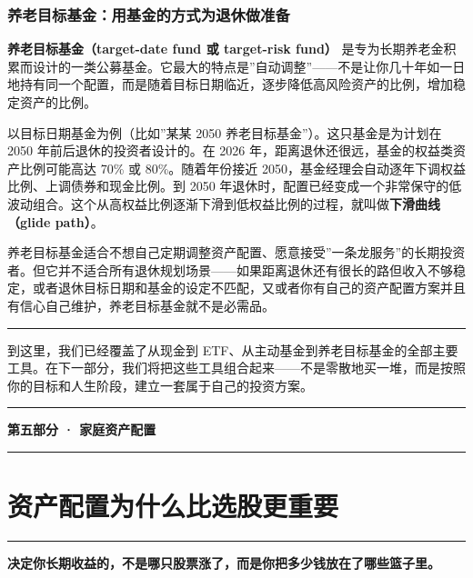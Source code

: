 \documentclass[a4paper,11pt,oneside,fontset=none,UTF8,zihao=-4]{ctexbook}
\newcommand{\partdivider}[1]{%
  \clearpage
  \thispagestyle{empty}%
  \vspace*{5.0cm}%
  \begin{center}%
    {\color{dh-blossom}\rule{0.35\textwidth}{1.5pt}\par}%
    \vspace{1.2cm}%
    {\Huge\bfseries\sffamily\color{dh-navy} #1\par}%
    \vspace{1.2cm}%
    {\color{dh-blossom}\rule{0.35\textwidth}{1.5pt}\par}%
  \end{center}%
  \vfill
  \clearpage
}
\begin{document}
\subsection{养老目标基金：用基金的方式为退休做准备}\label{ux517bux8001ux76eeux6807ux57faux91d1ux7528ux57faux91d1ux7684ux65b9ux5f0fux4e3aux9000ux4f11ux505aux51c6ux5907}

\textbf{养老目标基金（target-date fund 或 target-risk fund）}
是专为长期养老金积累而设计的一类公募基金。它最大的特点是''自动调整''------不是让你几十年如一日地持有同一个配置，而是随着目标日期临近，逐步降低高风险资产的比例，增加稳定资产的比例。

以目标日期基金为例（比如''某某 2050 养老目标基金''）。这只基金是为计划在
2050 年前后退休的投资者设计的。在 2026
年，距离退休还很远，基金的权益类资产比例可能高达 70\% 或
80\%。随着年份接近
2050，基金经理会自动逐年下调权益比例、上调债券和现金比例。到 2050
年退休时，配置已经变成一个非常保守的低波动组合。这个从高权益比例逐渐下滑到低权益比例的过程，就叫做\textbf{下滑曲线（glide
path）}。

养老目标基金适合不想自己定期调整资产配置、愿意接受''一条龙服务''的长期投资者。但它并不适合所有退休规划场景------如果距离退休还有很长的路但收入不够稳定，或者退休目标日期和基金的设定不匹配，又或者你有自己的资产配置方案并且有信心自己维护，养老目标基金就不是必需品。

\begin{center}{\color{dh-bronze}\rule{0.2\textwidth}{0.5pt}}\end{center}

到这里，我们已经覆盖了从现金到
ETF、从主动基金到养老目标基金的全部主要工具。在下一部分，我们将把这些工具组合起来------不是零散地买一堆，而是按照你的目标和人生阶段，建立一套属于自己的投资方案。

\partdivider{第五部分 · 家庭资产配置}

\newpage

\chapter{资产配置为什么比选股更重要}\label{ux8d44ux4ea7ux914dux7f6eux4e3aux4ec0ux4e48ux6bd4ux9009ux80a1ux66f4ux91cdux8981}

\begin{center}{\color{dh-bronze}\rule{0.2\textwidth}{0.5pt}}\end{center}

\begin{dhquote}
\textbf{决定你长期收益的，不是哪只股票涨了，而是你把多少钱放在了哪些篮子里。}
\end{dhquote}
\end{document}
